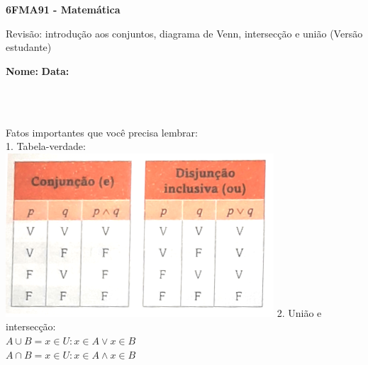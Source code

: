 \documentclass[a4paper,14pt]{article}
\begin{document}
	
	\noindent\textbf{6FMA91 - Matemática} 
	
	\begin{center}Revisão: introdução aos conjuntos, diagrama de Venn, intersecção e união (Versão estudante)
	\end{center}
	
	\noindent\textbf{Nome:} \underline{\hspace{10cm}}
	\noindent\textbf{Data:} \underline{\hspace{4cm}}
	
	~ \\ ~
	\begin{multicols}{2}
	\noindent Fatos importantes que você precisa lembrar: \\
	1. Tabela-verdade: \\
	\includegraphics[width=1\linewidth]{imagens_6FMA91/imagem1}
	2. União e intersecção: \\
	$A \cup B = {x \in U : x \in A \lor x \in B}$ \\
	$A \cap B = {x \in U : x \in A \land x \in B}$ \\

\end{multicols}
\end{document}
